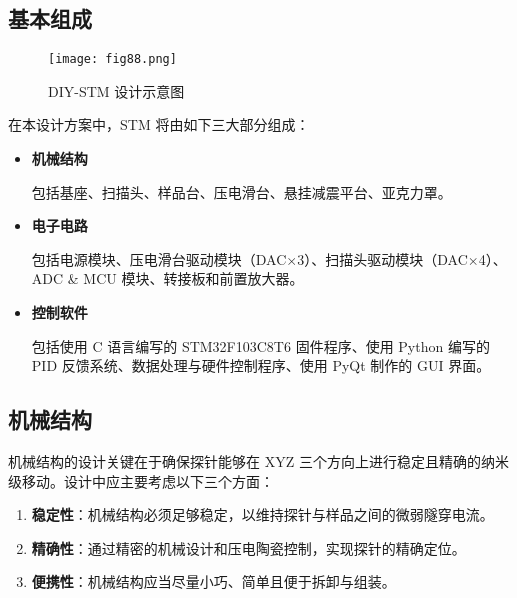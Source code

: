 \documentclass{article}
\begin{document}
\subsection{基本组成}
\begin{figure}[htbp]
	\centering
	\texttt{[image: fig88.png]}
	\caption{DIY-STM 设计示意图}
\end{figure}

在本设计方案中，STM 将由如下三大部分组成：

\begin{itemize}
	\item \textbf{机械结构}\par
	      \qquad 包括基座、扫描头、样品台、压电滑台、悬挂减震平台、亚克力罩。

	\item \textbf{电子电路}\par
	      \qquad 包括电源模块、压电滑台驱动模块（DAC$\times$3）、扫描头驱动模块（DAC$\times$4）、ADC \& MCU 模块、转接板和前置放大器。

	\item \textbf{控制软件}\par
	      \qquad 包括使用 C 语言编写的 STM32F103C8T6 固件程序、使用 Python 编写的 PID 反馈系统、数据处理与硬件控制程序、使用 PyQt 制作的 GUI 界面。

\end{itemize}

\subsection{机械结构}
机械结构的设计关键在于确保探针能够在 XYZ 三个方向上进行稳定且精确的纳米级移动。设计中应主要考虑以下三个方面：
\begin{enumerate}
	\item \textbf{稳定性}：机械结构必须足够稳定，以维持探针与样品之间的微弱隧穿电流。
	\item \textbf{精确性}：通过精密的机械设计和压电陶瓷控制，实现探针的精确定位。
	\item \textbf{便携性}：机械结构应当尽量小巧、简单且便于拆卸与组装。
\end{enumerate}
\end{document}
